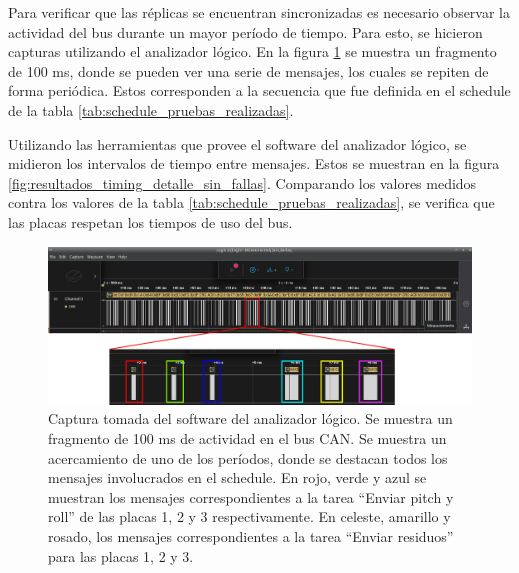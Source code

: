 
Para verificar que las réplicas se encuentran sincronizadas es necesario observar la actividad del bus durante un mayor período de tiempo. Para esto, se hicieron capturas utilizando el analizador lógico. En la figura \ref{fig:resultados_timing_sin_fallas} se muestra un fragmento de 100 ms, donde se pueden ver una serie de mensajes, los cuales se repiten de forma periódica. Estos corresponden a la secuencia que fue definida en el schedule de la tabla \ref{tab:schedule_pruebas_realizadas}.

Utilizando las herramientas que provee el software del analizador lógico, se midieron los intervalos de tiempo entre mensajes. Estos se muestran en la figura \ref{fig:resultados_timing_detalle_sin_fallas}. Comparando los valores medidos contra los valores de la tabla \ref{tab:schedule_pruebas_realizadas}, se verifica que las placas respetan los tiempos de uso del bus.


\begin{figure}[H]
    \centering
    \includegraphics[width=\textwidth]{img/resultados_timing_sin_fallas_zoom.png}
    \caption{Captura tomada del software del analizador lógico. Se muestra un fragmento de 100 ms de actividad en el bus CAN. Se muestra un acercamiento de uno de los períodos, donde se destacan todos los mensajes involucrados en el schedule. En rojo, verde y azul se muestran los mensajes correspondientes a la tarea ``Enviar pitch y roll'' de las placas 1, 2 y 3 respectivamente. En celeste, amarillo y rosado, los mensajes correspondientes a la tarea ``Enviar residuos'' para las placas 1, 2 y 3.}
    \label{fig:resultados_timing_sin_fallas}
\end{figure}

